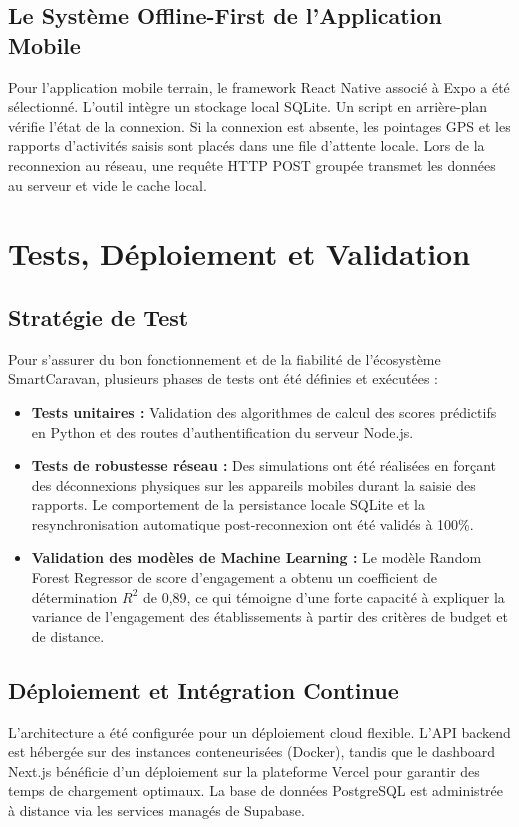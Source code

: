 \documentclass[12pt,a4paper]{report}
\begin{document}
\section{Le Système Offline-First de l'Application Mobile}
Pour l'application mobile terrain, le framework React Native associé à Expo a été sélectionné. L'outil intègre un stockage local SQLite. Un script en arrière-plan vérifie l'état de la connexion. Si la connexion est absente, les pointages GPS et les rapports d'activités saisis sont placés dans une file d'attente locale. Lors de la reconnexion au réseau, une requête HTTP POST groupée transmet les données au serveur et vide le cache local.

\chapter{Tests, Déploiement et Validation}

\section{Stratégie de Test}
Pour s'assurer du bon fonctionnement et de la fiabilité de l'écosystème SmartCaravan, plusieurs phases de tests ont été définies et exécutées :
\begin{itemize}
    \item \textbf{Tests unitaires :} Validation des algorithmes de calcul des scores prédictifs en Python et des routes d'authentification du serveur Node.js.
    \item \textbf{Tests de robustesse réseau :} Des simulations ont été réalisées en forçant des déconnexions physiques sur les appareils mobiles durant la saisie des rapports. Le comportement de la persistance locale SQLite et la resynchronisation automatique post-reconnexion ont été validés à 100\%.
    \item \textbf{Validation des modèles de Machine Learning :} Le modèle Random Forest Regressor de score d'engagement a obtenu un coefficient de détermination $R^2$ de 0,89, ce qui témoigne d'une forte capacité à expliquer la variance de l'engagement des établissements à partir des critères de budget et de distance.
\end{itemize}

\section{Déploiement et Intégration Continue}
L'architecture a été configurée pour un déploiement cloud flexible. L'API backend est hébergée sur des instances conteneurisées (Docker), tandis que le dashboard Next.js bénéficie d'un déploiement sur la plateforme Vercel pour garantir des temps de chargement optimaux. La base de données PostgreSQL est administrée à distance via les services managés de Supabase.
\end{document}
